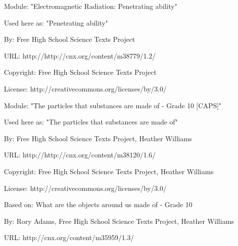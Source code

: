       \par\vspace{9pt}\noindent\begin{minipage}{\textwidth}
      Module: "Electromagnetic Radiation: Penetrating ability" \par\nopagebreak\noindent
      Used here as: "Penetrating ability" \par\nopagebreak\noindent
        By: Free High School Science Texts Project\par\nopagebreak\noindent
      URL: http://http://cnx.org/content/m38779/1.2/\par\nopagebreak\noindent
      \par\nopagebreak\noindent
      Copyright: Free High School Science Texts Project\par\nopagebreak\noindent
      License:  http://creativecommons.org/licenses/by/3.0/\par\nopagebreak\noindent
      \par\end{minipage}
      \par\vspace{9pt}\noindent\begin{minipage}{\textwidth}
      Module: "The particles that substances are made of - Grade 10 [CAPS]" \par\nopagebreak\noindent
      Used here as: "The particles that substances are made of" \par\nopagebreak\noindent
        By: Free High School Science Texts Project, Heather Williams\par\nopagebreak\noindent
      URL: http://http://cnx.org/content/m38120/1.6/\par\nopagebreak\noindent
      \par\nopagebreak\noindent
      Copyright: Free High School Science Texts Project, Heather Williams\par\nopagebreak\noindent
      License:  http://creativecommons.org/licenses/by/3.0/\par\nopagebreak\noindent
      Based on: What are the objects around us made of - Grade 10\par\nopagebreak\noindent
        By: Rory Adams, Free High School Science Texts Project, Heather Williams\par\nopagebreak\noindent
        URL: http://cnx.org/content/m35959/1.3/
        \par\end{minipage}
